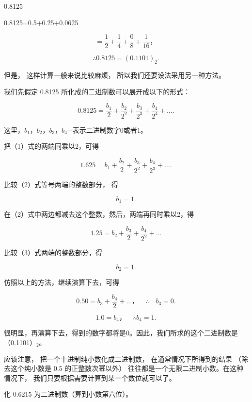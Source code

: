 0.8125

0.8125=0.5+0.25+0.0625

\[
= \frac{1}{2} + \frac{1}{4} + \frac{0}{8} + \frac{1}{16}\text{，}
\]

\[
\therefore 0.8125 = (0.1101) _{2}.
\]

但是， 这样计算一般来说比较麻烦， 所以我们还要设法采用另一种方法。

我们先假定 0.8125 所化成的二进制数可以展开成以下的形式：

\[
0.8125 = \frac{b _{1}}{2} + \frac{b _{2}}{2 ^{2}} + \frac{b _{3}}{2 ^{3}} + \frac{b _{4}}{2 ^{4}} + \dots . \tag {1}
\]

这里，\(b_{1}\)，\(b_{2}\)，\(b_{3}\)，\(b_{4}\cdots\)表示二进制数字0或者1。

把（1）式的两端同乘以2，可得

\[
1.625 = b _{1} + \frac{b _{2}}{2} + \frac{b _{3}}{2 ^{2}} + \frac{b _{4}}{2 ^{3}} + \dots . \tag {2}
\]

比较（2）式等号两端的整数部分， 得

\[
b _{1} = 1.
\]

在（2）式中两边都减去这个整数，然后，两端再同时乘以2，得

\[
1.25 = b _{2} + \frac{b _{3}}{2} + \frac{b _{4}}{2 ^{2}} + \dots \tag {3}
\]

比较（3）式两端的整数部分，得

\[
b _{2} = 1.
\]

仿照以上的方法，继续演算下去，可得

\[
0.50 = b _{3} + \frac{b _{4}}{2} + \dots \text{，} \quad \therefore \quad b _{3} = 0.
\]

\[
1.0 = b _{4}\text{，} \quad \therefore b _{4} = 1.
\]

很明显，再演算下去，得到的数字都将是0。因此，我们所求的这个二进制数是（0.1101）\(_{2}\)。

应该注意， 把一个十进制纯小数化成二进制数， 在通常情况下所得到的结果
（除去这个纯小数是 0.5 的正整数次幂以外）
往往都是一个无限二进制小数。在这种情况下，
我们只要根据需要计算到某一个数位就可以了。

 化 0.6215 为二进制数（算到小数第六位）。


